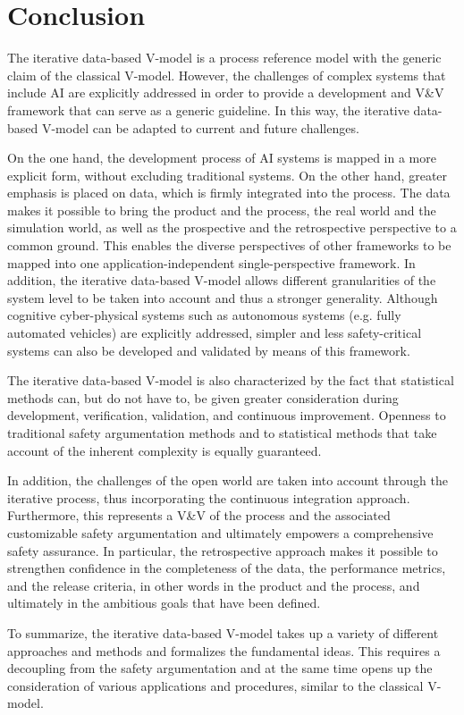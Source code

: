 \section{Conclusion}\label{05_Conclusion}

The iterative data-based V-model is a process reference model with the generic claim of the classical V-model. However, the challenges of complex systems that include AI are explicitly addressed in order to provide a development and V\&V framework that can serve as a generic guideline. In this way, the iterative data-based V-model can be adapted to current and future challenges.

On the one hand, the development process of AI systems is mapped in a more explicit form, without excluding traditional systems. On the other hand, greater emphasis is placed on data, which is firmly integrated into the process. The data makes it possible to bring the product and the process, the real world and the simulation world, as well as the prospective and the retrospective perspective to a common ground. This enables the diverse perspectives of other frameworks to be mapped into one application-independent single-perspective framework. In addition, the iterative data-based V-model allows different granularities of the system level to be taken into account and thus a stronger generality. Although cognitive cyber-physical systems such as autonomous systems (e.g. fully automated vehicles) are explicitly addressed, simpler and less safety-critical systems can also be developed and validated by means of this framework.

The iterative data-based V-model is also characterized by the fact that statistical methods can, but do not have to, be given greater consideration during development, verification, validation, and continuous improvement. Openness to traditional safety argumentation methods and to statistical methods that take account of the inherent complexity is equally guaranteed.

In addition, the challenges of the open world are taken into account through the iterative process, thus incorporating the continuous integration approach. Furthermore, this represents a V\&V of the process and the associated customizable safety argumentation and ultimately empowers a comprehensive safety assurance. In particular, the retrospective approach makes it possible to strengthen confidence in the completeness of the data, the performance metrics, and the release criteria, in other words in the product and the process, and ultimately in the ambitious goals that have been defined.

To summarize, the iterative data-based V-model takes up a variety of different approaches and methods and formalizes the fundamental ideas. This requires a decoupling from the safety argumentation and at the same time opens up the consideration of various applications and procedures, similar to the classical V-model.

